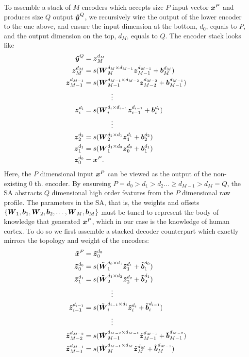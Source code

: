 To assemble a stack of $M$ encoders which accepts size $P$ input vector $\xEC^P$ and produces size $Q$ output $\yHT^Q$, we recursively wire the output of the lower encoder to the one above, and ensure the input dimension at the bottom, $d_0$, equals to $P$, and the output dimension on the top, $d_M$, equals to $Q$. The encoder stack looks like
\begin{equation} \label{eq:SE}
  \begin{split}
    \yHT^Q &= \zEI{M}{M} \\
    \zEI{M  }{M  } &= s(\WEI{M  }{M  }{M-1} \zEI{M-1}{M-1} + \bEI{M  }{M  }) \\
    \zEI{M-1}{M-1} &= s(\WEI{M-1}{M-1}{M-2} \zEI{M-2}{M-2} + \bEI{M-1}{M-1}) \\
    & \quad \quad \quad \quad \vdots \\
    \zEI{i  }{i  } &= s(\WEI{i  }{i  }{i-1} \zEI{i-1}{i-1} + \bEI{i  }{i  }) \\
    & \quad \quad \quad \quad \vdots \\
    \zEI{2  }{2  } &= s(\WEI{2  }{2  }{1  } \zEI{1  }{1  } + \bEI{2  }{2  }) \\
    \zEI{1  }{1  } &= s(\WEI{1  }{1  }{0  } \zEI{0  }{0  } + \bEI{1  }{1  }) \\
    \zEI{0  }{0  } &= \xEC^P.
  \end{split}
\end{equation}
Here, the $P$ dimensional input $\xEC^P$ can be viewed as the output of the non-existing $0$ th. encoder. By ensureing $P = d_0 > d_1 > d_2 \dots \ge d_{M-1} > d_M = Q$, the SA abstracts $Q$ dimensional high order features from the $P$ dimensional raw profile.
The parameters in the SA, that is, the weights and offsets $\{\WEC_1, \bEC_1, \WEC_2, \bEC_2, \dots, \WEC_M, \bEC_M\}$ must be tuned to represent the body of knowledge that generated $\xEC^P$, which in our case is the knowledge of human cortex. To do so we first assemble a stacked decoder counterpart which exactly mirrors the topology and weight of the encoders:
\begin{equation} \label{eq:SD}
  \begin{split}
    \xDC^P &= \zDI{0}{0} \\
    \zDI{0  }{0  } &= s(\WDI{1  }{0  }{1  } \zDI{1  }{1  } + \bDI{1  }{0  }) \\
    \zDI{1  }{1  } &= s(\WDI{2  }{1  }{2  } \zDI{2  }{2  } + \bDI{2  }{1  }) \\
    & \quad \quad \quad \quad \vdots \\
    \zDI{i-1}{i-1} &= s(\WDI{i  }{i-1}{i  } \zDI{i  }{i  } + \bDI{i  }{i-1}) \\
    & \quad \quad \quad \quad \vdots \\
    \zDI{M-2}{M-2} &= s(\WDI{M-1}{M-2}{M-1} \zDI{M-1}{M-1} + \bDI{M-1}{M-2}) \\
    \zDI{M-1}{M-1} &= s(\WDI{M  }{M-1}{M  } \zDI{M  }{M  } + \bDI{M  }{M-1}) \\
  \end{split}
\end{equation}
